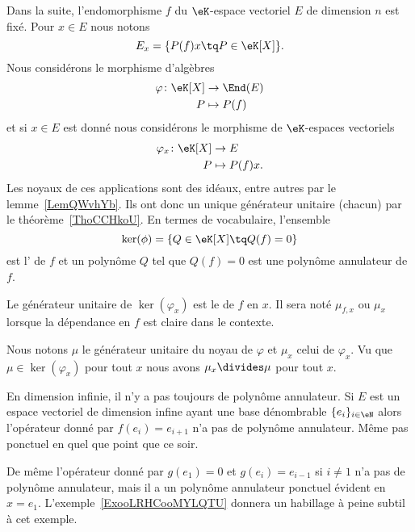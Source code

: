 Dans la suite, l'endomorphisme \( f\) du \( \eK\)-espace vectoriel \( E\) de dimension \( n\) est fixé. Pour \( x\in E\) nous notons
\begin{equation}            \label{EqooOAYDooEpZELo}
    E_x=\{ P(f)x\tq P\in \eK[X] \}.
\end{equation}
Nous considérons le morphisme d'algèbres
\begin{equation}
    \begin{aligned}
        \varphi\colon \eK[X]&\to \End(E) \\
        P&\mapsto P(f)
    \end{aligned}
\end{equation}
et si \( x\in E\) est donné nous considérons le morphisme de \( \eK\)-espaces vectoriels
\begin{equation}
    \begin{aligned}
        \varphi_x\colon \eK[X]&\to E \\
        P&\mapsto P(f)x.
    \end{aligned}
\end{equation}
Les noyaux de ces applications sont des idéaux, entre autres par le lemme~\ref{LemQWvhYb}. Ils ont donc un unique générateur unitaire (chacun) par le théorème~\ref{ThoCCHkoU}. En termes de vocabulaire, l'ensemble
\begin{equation}
    \ker(\phi)=\{  Q\in\eK[X]\tq Q(f)=0  \}
\end{equation}
est l' de \( f\) et un polynôme \( Q\) tel que \( Q(f)=0\) est une polynôme annulateur de \( f\).

\begin{definition}      \label{DEFooUICRooBGYhqQ}
    Le générateur unitaire de \( \ker(\varphi_x)\) est le  de \( f\) en \( x\). Il sera noté \( \mu_{f,x}\) ou \( \mu_x\) lorsque la dépendance en \( f\) est claire dans le contexte.
\end{definition}
Nous notons \( \mu\) le générateur unitaire du noyau de \( \varphi\) et \( \mu_x\) celui de \( \varphi_x\). Vu que \( \mu\in\ker(\varphi_x)\) pour tout \( x\) nous avons \( \mu_x\divides \mu\) pour tout \( x\).

\begin{example}       \label{ExooDTUJooIMqSKn}
    En dimension infinie, il n'y a pas toujours de polynôme annulateur. Si \( E\) est un espace vectoriel de dimension infine ayant une base dénombrable \( \{ e_i \}_{i\in \eN}\) alors l'opérateur donné par \( f(e_i)=e_{i+1}\) n'a pas de polynôme annulateur. Même pas ponctuel en quel que point que ce soir.

    De même l'opérateur donné par \( g(e_1)=0\) et \( g(e_i)=e_{i-1}\) si \( i\neq 1\) n'a pas de polynôme annulateur, mais il a un polynôme annulateur ponctuel évident en \( x=e_1\). L'exemple~\ref{ExooLRHCooMYLQTU} donnera un habillage à peine subtil à cet exemple.
\end{example}

